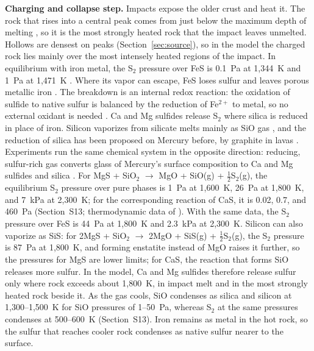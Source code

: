 \documentclass[article,review]{planetary}
\begin{document}
\textbf{Charging and collapse step.} Impacts expose the older crust and heat it. The rock that rises into a central peak comes from just below the maximum depth of melting \parencite{cintala1998}, so it is the most strongly heated rock that the impact leaves unmelted. Hollows are densest on peaks (Section~\ref{sec:source}), so in the model the charged rock lies mainly over the most intensely heated regions of the impact. In equilibrium with iron metal, the S$_2$ pressure over FeS is 0.1~Pa at 1,344~K and 1~Pa at 1,471~K \parencite[Section~S13;][]{janaf_fe025}. Where its vapor can escape, FeS loses sulfur and leaves porous metallic iron \parencite{tachibana1998}. The breakdown is an internal redox reaction: the oxidation of sulfide to native sulfur is balanced by the reduction of Fe$^{2+}$ to metal, so no external oxidant is needed \parencite{brett1976}. Ca and Mg sulfides release S$_2$ where silica is reduced in place of iron. Silicon vaporizes from silicate melts mainly as SiO gas \parencite{schaeferCHEMISTRYSILICATEATMOSPHERES2009,sossiThermodynamicsElementVolatility2018}, and the reduction of silica has been proposed on Mercury before, by graphite in lavas \parencite{mccubbinLowOSi2017}. Experiments run the same chemical system in the opposite direction: reducing, sulfur-rich gas converts glass of Mercury's surface composition to Ca and Mg sulfides and silica \parencite{renggli2022}. For MgS + SiO$_2$ $\rightarrow$ MgO + SiO(g) + $\frac{1}{2}$S$_2$(g), the equilibrium S$_2$ pressure over pure phases is 1~Pa at 1,600~K, 26~Pa at 1,800~K, and 7~kPa at 2,300~K; for the corresponding reaction of CaS, it is 0.02, 0.7, and 460~Pa (Section~S13; thermodynamic data of \cite{mcbride2002}). With the same data, the S$_2$ pressure over FeS is 44~Pa at 1,800~K and 2.3~kPa at 2,300~K. Silicon can also vaporize as SiS: for 2MgS + SiO$_2$ $\rightarrow$ 2MgO + SiS(g) + $\frac{1}{2}$S$_2$(g), the S$_2$ pressure is 87~Pa at 1,800~K, and forming enstatite instead of MgO raises it further, so the pressures for MgS are lower limits; for CaS, the reaction that forms SiO releases more sulfur. In the model, Ca and Mg sulfides therefore release sulfur only where rock exceeds about 1,800~K, in impact melt and in the most strongly heated rock beside it. As the gas cools, SiO condenses as silica and silicon at 1,300--1,500~K for SiO pressures of 1--50~Pa, whereas S$_2$ at the same pressures condenses at 500--600~K (Section~S13). Iron remains as metal in the hot rock, so the sulfur that reaches cooler rock condenses as native sulfur nearer to the surface.
\end{document}
